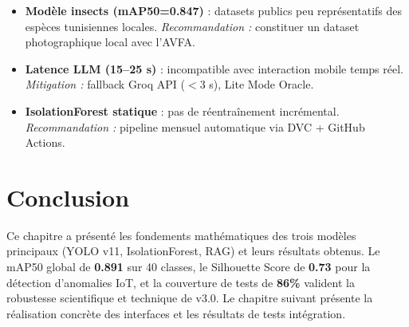 \begin{tcolorbox}[warningbox, title={Limites identifiées et recommandations}]
\begin{itemize}
  \item \textbf{Modèle insects (mAP50=0.847)} : datasets publics peu représentatifs
        des espèces tunisiennes locales. \textit{Recommandation :} constituer un
        dataset photographique local avec l'AVFA.
  \item \textbf{Latence LLM (15--25 s)} : incompatible avec interaction mobile temps
        réel. \textit{Mitigation :} fallback Groq API ($<$3 s), Lite Mode Oracle.
  \item \textbf{IsolationForest statique} : pas de réentraînement incrémental.
        \textit{Recommandation :} pipeline mensuel automatique via DVC + GitHub Actions.
\end{itemize}
\end{tcolorbox}

\section{Conclusion}

Ce chapitre a présenté les fondements mathématiques des trois modèles principaux
(YOLO v11, IsolationForest, RAG) et leurs résultats obtenus. Le mAP50 global de
\textbf{0.891} sur 40 classes, le Silhouette Score de \textbf{0.73} pour la détection
d'anomalies IoT, et la couverture de tests de \textbf{86\%} valident la robustesse
scientifique et technique de \farmAI{} v3.0. Le chapitre suivant présente la réalisation
concrète des interfaces et les résultats de tests intégration.
